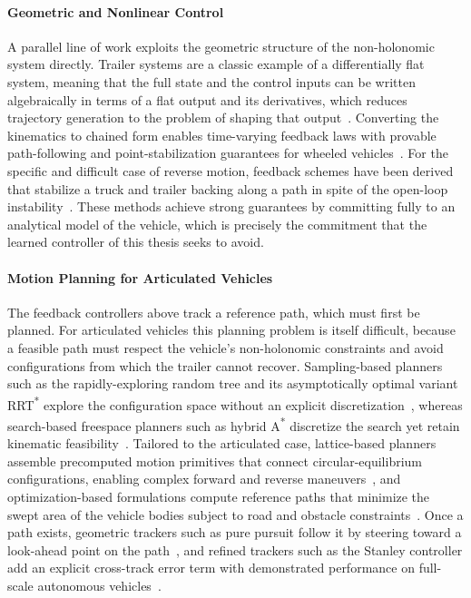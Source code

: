 \paragraph{Geometric and Nonlinear Control}
A parallel line of work exploits the geometric structure of the non-holonomic system directly. Trailer systems are a classic example of a differentially flat system, meaning that the full state and the control inputs can be written algebraically in terms of a flat output and its derivatives, which reduces trajectory generation to the problem of shaping that output~\cite{fliess1995flatness}. Converting the kinematics to chained form enables time-varying feedback laws with provable path-following and point-stabilization guarantees for wheeled vehicles~\cite{samson1995chained}. For the specific and difficult case of reverse motion, feedback schemes have been derived that stabilize a truck and trailer backing along a path in spite of the open-loop instability~\cite{altafini2001reversing}. These methods achieve strong guarantees by committing fully to an analytical model of the vehicle, which is precisely the commitment that the learned controller of this thesis seeks to avoid.

\paragraph{Motion Planning for Articulated Vehicles}
The feedback controllers above track a reference path, which must first be planned. For articulated vehicles this planning problem is itself difficult, because a feasible path must respect the vehicle's non-holonomic constraints and avoid configurations from which the trailer cannot recover. Sampling-based planners such as the rapidly-exploring random tree and its asymptotically optimal variant RRT\textsuperscript{*} explore the configuration space without an explicit discretization~\cite{karaman2011sampling, lavalle2006planning}, whereas search-based freespace planners such as hybrid A\textsuperscript{*} discretize the search yet retain kinematic feasibility~\cite{dolgov2010hybridastar}. Tailored to the articulated case, lattice-based planners assemble precomputed motion primitives that connect circular-equilibrium configurations, enabling complex forward and reverse maneuvers~\cite{ljungqvist2017lattice}, and optimization-based formulations compute reference paths that minimize the swept area of the vehicle bodies subject to road and obstacle constraints~\cite{oliveira2020optimization}. Once a path exists, geometric trackers such as pure pursuit follow it by steering toward a look-ahead point on the path~\cite{coulter1992pure}, and refined trackers such as the Stanley controller add an explicit cross-track error term with demonstrated performance on full-scale autonomous vehicles~\cite{hoffmann2007autonomous}.

